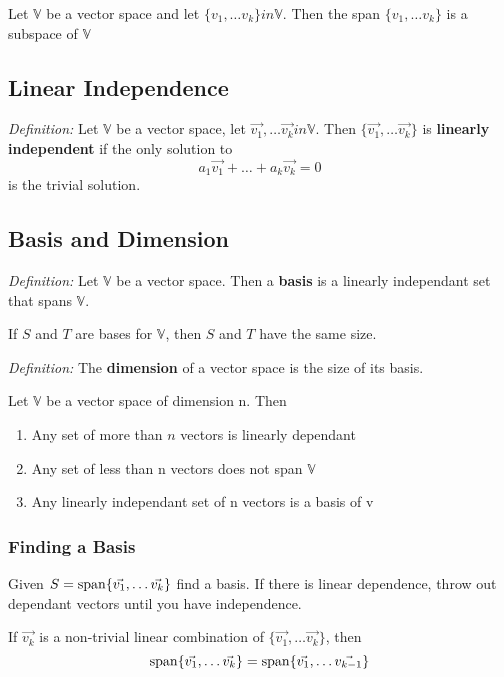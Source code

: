 \documentclass[12pt]{article}
\newcommand{\spanv}[1]{{\rm span}\{#1\}}
\begin{document}
\begin{theorem}
Let $\mathbb{V}$ be a vector space and let $\{v_1,\dots v_k\} in \mathbb{V}$. Then the span $\{v_1,\dots v_k\}$ is a subspace of $\mathbb{V}$
\end{theorem}

\subsection*{Linear Independence}
\textit{Definition:} Let $\mathbb{V}$ be a vector space, let $\vec{v_1},\dots \vec{v_k} in \mathbb{V}$. Then $\{\vec{v_1},\dots \vec{v_k}\}$ is {\bf linearly independent} if the only solution to \[ a_1\vec{v_1} + \dots + a_k\vec{v_k} = 0 \] is the trivial solution.

\subsection*{Basis and Dimension}
\textit{Definition:} Let $\mathbb{V}$ be a vector space. Then a {\bf basis} is a linearly independant set that spans $\mathbb{V}$.

\begin{theorem}
If $S$ and $T$ are bases for $\mathbb{V}$, then $S$ and $T$ have the same size.
\end{theorem}

\textit{Definition:} The {\bf dimension} of a vector space is the size of its basis.

Let $\mathbb{V}$ be a vector space of dimension n. Then
\begin{enumerate}
\item Any set of more than $n$ vectors is linearly dependant
\item Any set of less than n vectors does not span $\mathbb{V}$
\item Any linearly independant set of n vectors is a basis of v
\end{enumerate}

\subsubsection*{Finding a Basis}
Given $S = \spanv{\vec{v_1},\dots \vec{v_k}}$ find a basis. If there is linear dependence, throw out dependant vectors until you have independence.

\begin{theorem}
If $\vec{v_k}$ is a non-trivial linear combination of $\{\vec{v_1}, \dots \vec{v_k}\}$, then \[ \spanv{\vec{v_1},\dots \vec{v_k}} = \spanv{\vec{v_1},\dots \vec{v_{k-1}}} \]
\end{theorem}
\end{document}
